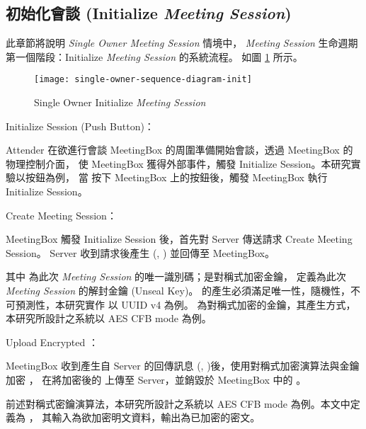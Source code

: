 \subsection{初始化會談 (Initialize {\it Meeting Session})}
\label{subsec.initialize}

    此章節將說明 {\it Single Owner Meeting Session} 情境中，
{\it Meeting Session} 生命週期第一個階段：Initialize {\it Meeting Session} 的系統流程。
如圖 \ref{fig:s-o-init} 所示。

\begin{figure}[H]
    \centering
    \texttt{[image: single-owner-sequence-diagram-init]}
    \caption{Single Owner Initialize {\it Meeting Session}}
    \label{fig:s-o-init}
\end{figure}

\begin{steps}
    \item Initialize Session (Push Button)：

            Attender 在欲進行會談 MeetingBox 的周圍準備開始會談，\DEFattender 透過 MeetingBox 的物理控制介面，
        使 MeetingBox 獲得外部事件，觸發 Initialize Session。本研究實驗以按鈕為例，
        當 \DEFattender 按下 MeetingBox 上的按鈕後，觸發 MeetingBox 執行 Initialize Session。

    \item Create Meeting Session：

            MeetingBox 觸發 Initialize Session 後，首先對 Server 傳送請求 Create Meeting Session。
        Server 收到請求後產生 (\DEFsessionID, \DEFunsealKey) 並回傳至 MeetingBox。

            其中 \DEFsessionID 為此次 {\it Meeting Session} 的唯一識別碼；\DEFunsealKey 是對稱式加密金鑰，
        定義為此次 {\it Meeting Session} 的解封金鑰 (Unseal Key)。
        \DEFsessionID 的產生必須滿足唯一性，隨機性，不可預測性，本研究實作 \DEFsessionID 以 UUID v4 為例。
        \DEFunsealKey 為對稱式加密的金鑰，其產生方式，本研究所設計之系統以 AES CFB mode 為例。

    \item Upload Encrypted \DEFrecN：

            MeetingBox 收到產生自 Server 的回傳訊息 (\DEFsessionID, \DEFunsealKey)後，使用對稱式加密演算法與金鑰 \DEFunsealKey 加密 \DEFrecN，
        在將加密後的 \DEFrecN 上傳至 Server，並銷毀於 MeetingBox 中的 \DEFunsealKey。

            前述對稱式密鑰演算法，本研究所設計之系統以 AES CFB mode 為例。本文中定義為 \DEFfuncEncEK，
        其輸入為欲加密明文資料，輸出為已加密的密文。


\end{steps}
